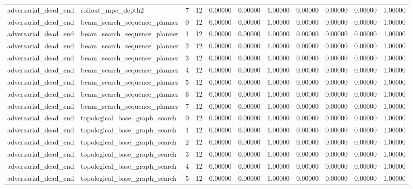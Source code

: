 \documentclass{article}
\begin{document}
\begin{table}[tbp]
{\begin{tabular}{lllllllllll}
adversarial\_dead\_end & rollout\_mpc\_depth2 & 7 & 12 & 0.00000 & 0.00000 & 1.00000 & 0.00000 & 0.00000 & 0.00000 & 1.00000 \\
adversarial\_dead\_end & beam\_search\_sequence\_planner & 0 & 12 & 0.00000 & 0.00000 & 1.00000 & 0.00000 & 0.00000 & 0.00000 & 1.00000 \\
adversarial\_dead\_end & beam\_search\_sequence\_planner & 1 & 12 & 0.00000 & 0.00000 & 1.00000 & 0.00000 & 0.00000 & 0.00000 & 1.00000 \\
adversarial\_dead\_end & beam\_search\_sequence\_planner & 2 & 12 & 0.00000 & 0.00000 & 1.00000 & 0.00000 & 0.00000 & 0.00000 & 1.00000 \\
adversarial\_dead\_end & beam\_search\_sequence\_planner & 3 & 12 & 0.00000 & 0.00000 & 1.00000 & 0.00000 & 0.00000 & 0.00000 & 1.00000 \\
adversarial\_dead\_end & beam\_search\_sequence\_planner & 4 & 12 & 0.00000 & 0.00000 & 1.00000 & 0.00000 & 0.00000 & 0.00000 & 1.00000 \\
adversarial\_dead\_end & beam\_search\_sequence\_planner & 5 & 12 & 0.00000 & 0.00000 & 1.00000 & 0.00000 & 0.00000 & 0.00000 & 1.00000 \\
adversarial\_dead\_end & beam\_search\_sequence\_planner & 6 & 12 & 0.00000 & 0.00000 & 1.00000 & 0.00000 & 0.00000 & 0.00000 & 1.00000 \\
adversarial\_dead\_end & beam\_search\_sequence\_planner & 7 & 12 & 0.00000 & 0.00000 & 1.00000 & 0.00000 & 0.00000 & 0.00000 & 1.00000 \\
adversarial\_dead\_end & topological\_base\_graph\_search & 0 & 12 & 0.00000 & 0.00000 & 1.00000 & 0.00000 & 0.00000 & 0.00000 & 1.00000 \\
adversarial\_dead\_end & topological\_base\_graph\_search & 1 & 12 & 0.00000 & 0.00000 & 1.00000 & 0.00000 & 0.00000 & 0.00000 & 1.00000 \\
adversarial\_dead\_end & topological\_base\_graph\_search & 2 & 12 & 0.00000 & 0.00000 & 1.00000 & 0.00000 & 0.00000 & 0.00000 & 1.00000 \\
adversarial\_dead\_end & topological\_base\_graph\_search & 3 & 12 & 0.00000 & 0.00000 & 1.00000 & 0.00000 & 0.00000 & 0.00000 & 1.00000 \\
adversarial\_dead\_end & topological\_base\_graph\_search & 4 & 12 & 0.00000 & 0.00000 & 1.00000 & 0.00000 & 0.00000 & 0.00000 & 1.00000 \\
adversarial\_dead\_end & topological\_base\_graph\_search & 5 & 12 & 0.00000 & 0.00000 & 1.00000 & 0.00000 & 0.00000 & 0.00000 & 1.00000 \\

\end{tabular}}
\end{table}
\end{document}
